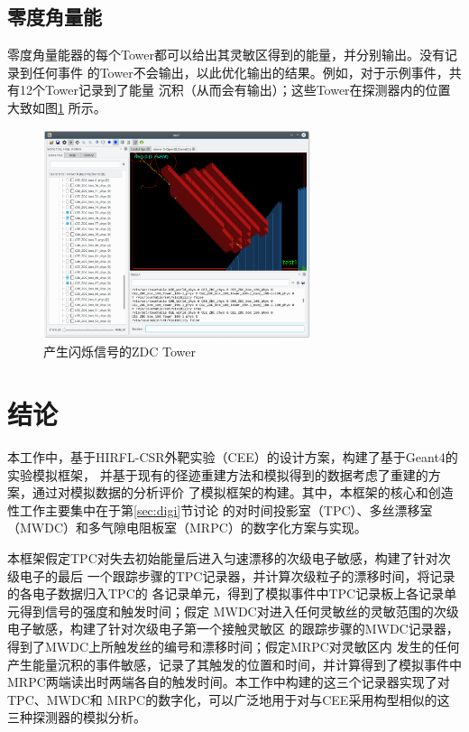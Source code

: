 \documentclass[bachelor,openany,oneside,color]{buaathesis}
\begin{document}
\section{零度角量能}

零度角量能器的每个Tower都可以给出其灵敏区得到的能量，并分别输出。没有记录到任何事件
的Tower不会输出，以此优化输出的结果。例如，对于示例事件，共有12个Tower记录到了能量
沉积（从而会有输出）；这些Tower在探测器内的位置大致如图\ref{fig:result:ZDC:Display}
所示。

\begin{figure}
	\centering
	\includegraphics[width=0.7\textwidth]{./resource/ZDC-Display.png}
	\caption{产生闪烁信号的ZDC Tower}\label{fig:result:ZDC:Display}
\end{figure}


\chapter*{结论}
本工作中，基于HIRFL-CSR外靶实验（CEE）的设计方案，构建了基于Geant4的实验模拟框架，
并基于现有的径迹重建方法和模拟得到的数据考虑了重建的方案，通过对模拟数据的分析评价
了模拟框架的构建。其中，本框架的核心和创造性工作主要集中在于第\ref{sec:digi}节讨论
的对时间投影室（TPC）、多丝漂移室（MWDC）和多气隙电阻板室（MRPC）的数字化方案与实现。

本框架假定TPC对失去初始能量后进入匀速漂移的次级电子敏感，构建了针对次级电子的最后
一个跟踪步骤的TPC记录器，并计算次级粒子的漂移时间，将记录的各电子数据归入TPC的
各记录单元，得到了模拟事件中TPC记录板上各记录单元得到信号的强度和触发时间；假定
MWDC对进入任何灵敏丝的灵敏范围的次级电子敏感，构建了针对次级电子第一个接触灵敏区
的跟踪步骤的MWDC记录器，得到了MWDC上所触发丝的编号和漂移时间；假定MRPC对灵敏区内
发生的任何产生能量沉积的事件敏感，记录了其触发的位置和时间，并计算得到了模拟事件中
MRPC两端读出时两端各自的触发时间。本工作中构建的这三个记录器实现了对TPC、MWDC和
MRPC的数字化，可以广泛地用于对与CEE采用构型相似的这三种探测器的模拟分析。
\end{document}
